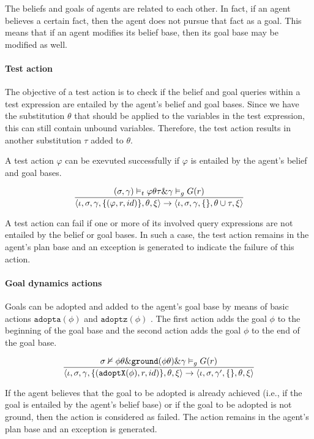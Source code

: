 \documentclass[a4paper]{article}
\begin{document}
The beliefs and goals of agents are related to each other. In fact, if an agent believes a
certain fact, then the agent does not pursue that fact as a goal. This means that if an agent
modifies its belief base, then its goal base may be modiﬁed as well.

\paragraph{Test action}

The objective of a test action is to check if the belief and goal queries within a test expression are entailed by the agent's belief and goal bases. Since we have the substitution $\theta$ that should be applied to the variables in the test expression, this can still contain unbound variables. Therefore, the test action results in another substitution $\tau$ added to $\theta$.

A test action $\varphi$ can be exevuted successfully if $\varphi$ is entailed by the agent's belief and goal bases.

$$ {{( \sigma, \gamma) \vDash_{t} \varphi \theta \tau \& \gamma \vDash_{g} G(r)}\over{\langle \iota, \sigma, \gamma, \{(\varphi, r, id)\}, \theta, \xi \rangle  \rightarrow \langle \iota, \sigma, \gamma, \{\}, \theta \cup \tau, \xi \rangle}} $$

A test action can fail if one or more of its involved query expressions are not entailed by the belief or goal bases. In such a case, the test action remains in the agent's plan base and an exception is generated to indicate the failure of this action.

\paragraph{Goal dynamics actions}

Goals can be adopted and added to the agent's goal base by means of basic actions $\texttt{adopta}(\phi)$ and $\texttt{adoptz}(\phi)$ . The ﬁrst action adds the goal $\phi$ to the beginning of the goal base and the second action adds the goal $\phi$ to the end of the goal base.

$$ {{{\sigma \nvDash \phi \theta} \& {\texttt{ground}(\phi \theta)} \& {\gamma \vDash_{g} G(r)}}\over{\langle \iota, \sigma, \gamma, \{(\texttt{adoptX}(\phi), r, id)\}, \theta, \xi \rangle  \rightarrow \langle \iota, \sigma, \gamma', \{\}, \theta, \xi \rangle}} $$

If the agent believes that the goal to be adopted is already achieved (i.e., if the goal is entailed by the agent's belief base) or if the goal to be adopted is not ground, then the action is considered as failed. The action remains in the agent’s plan base and an exception is generated.
\end{document}
